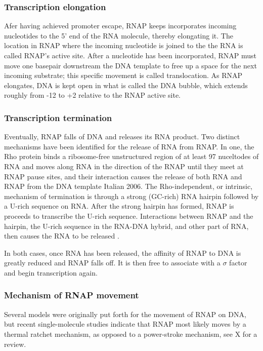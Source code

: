 \subsubsection{Transcription elongation}
Afer having achieved promoter escape, RNAP keeps incorporates incoming
nucleotides to the 5' end of the RNA molecule, thereby elongating it. The
location in RNAP where the incoming nucleotide is joined to the the RNA is
called RNAP's active site. After a nucleotide has been incorporated, RNAP must
move one basepair downstream the DNA template to free up a space for the next
incoming substrate; this specific movement is called translocation. As RNAP
elongates, DNA is kept open in what is called the DNA bubble, which extends
roughly from -12 to +2 relative to the RNAP active site.

\subsubsection{Transcription termination}
Eventually, RNAP falls of DNA and releases its RNA product. Two distinct
mechanisms have been identified for the release of RNA from RNAP. In one, the
Rho protein binds a ribosome-free unstructured region of at least 97 nuceltodes
of RNA and moves along RNA in the direction of the RNAP until they meet at RNAP
pause sites, and their interaction causes the release of both RNA and RNAP from
the DNA template \cite{ciampi_rho-dependent_2006} Italian 2006. The
Rho-independent, or intrinsic, mechanism of termination is through a strong
(GC-rich) RNA hairpin followed by a U-rich sequence on RNA. After the strong
hairpin has formed, RNAP is proceeds to transcribe the U-rich sequence.
Interactions between RNAP and the hairpin, the U-rich sequence in the RNA-DNA
hybrid, and other part of RNA, then causes the RNA to be released
\cite{nudler_transcription_2002}.

In both cases, once RNA has been released, the affinity of RNAP to DNA is
greatly reduced and RNAP falls off. It is then free to associate with a
$\sigma$ factor and begin transcription again.

\subsubsection{Mechanism of RNAP movement}
Several models were originally put forth for the movement of RNAP on DNA, but
recent single-molecule studies indicate that RNAP most likely moves by a
thermal ratchet mechanism, as opposed to a power-stroke mechanism, see X for a
review.

